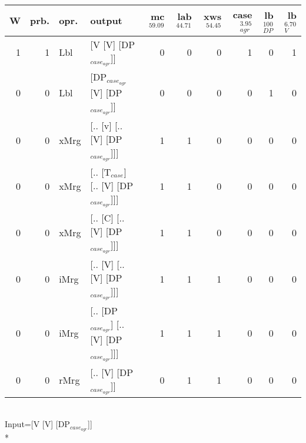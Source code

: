 \begin{tabularx}{\linewidth}{rrlXrrrrrr}
\hline
   W &   prb. & opr.   & output                                    &   mc$^{59.09}$ &   lab$^{44.71}$ &   xws$^{54.45}$ &   case$_{agr}^{3.95}$ &   lb$_{DP}^{100}$ &   lb$_{V}^{6.70}$ \\
\hline
   1 &   1 & Lbl  & [V [V] [DP$_{case_{agr}}$]]                     &            0 &             0 &             0 &                  1 &                0 &              1 \\
   0 &   0 & Lbl  & [DP$_{case_{agr}}$ [V] [DP$_{case_{agr}}$]]           &            0 &             0 &             0 &                  0 &                1 &              0 \\
   0 &   0 & xMrg & [.. [v] [.. [V] [DP$_{case_{agr}}$]]]           &            1 &             1 &             0 &                  0 &                0 &              0 \\
   0 &   0 & xMrg & [.. [T$_{case}$] [.. [V] [DP$_{case_{agr}}$]]]      &            1 &             1 &             0 &                  0 &                0 &              0 \\
   0 &   0 & xMrg & [.. [C] [.. [V] [DP$_{case_{agr}}$]]]           &            1 &             1 &             0 &                  0 &                0 &              0 \\
   0 &   0 & iMrg & [.. [V] [.. [V] [DP$_{case_{agr}}$]]]           &            1 &             1 &             1 &                  0 &                0 &              0 \\
   0 &   0 & iMrg & [.. [DP$_{case_{agr}}$] [.. [V] [DP$_{case_{agr}}$]]] &            1 &             1 &             1 &                  0 &                0 &              0 \\
   0 &   0 & rMrg & [.. [V] [DP$_{case_{agr}}$]]                    &            0 &             1 &             1 &                  0 &                0 &              0 \\
\hline
\end{tabularx}\endgroup\\
\begingroup\scriptsize Input=[V [V] [DP$_{case_{agr}}$]]\\*
